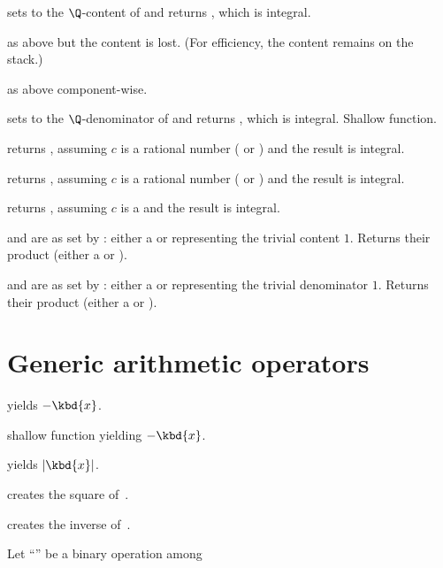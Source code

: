  sets  to the $\Q$-content
of  and returns , which is integral.

 as above but the content is lost. (For
efficiency, the content remains on the stack.)

 as above component-wise.

 sets  to the
$\Q$-denominator of  and returns , which is integral.
Shallow function.

 returns , assuming $c$
is a rational number ( or ) and the result is integral.

 returns , assuming $c$
is a rational number ( or ) and the result is integral.

 returns , assuming $c$
is a  and the result is integral.

   and  are
as set by : either a  or 
representing the trivial content $1$. Returns their product (either a
 or ).

  and  are
as set by : either a  or  representing
the trivial denominator $1$. Returns their product (either a  or
).

\section{Generic arithmetic operators}


 yields $-\kbd{x}$.

 shallow function yielding $-\kbd{x}$.

 yields $|\kbd{x}|$.

 creates the square of~.

 creates the inverse of~.


Let ``\op'' be a binary operation among

